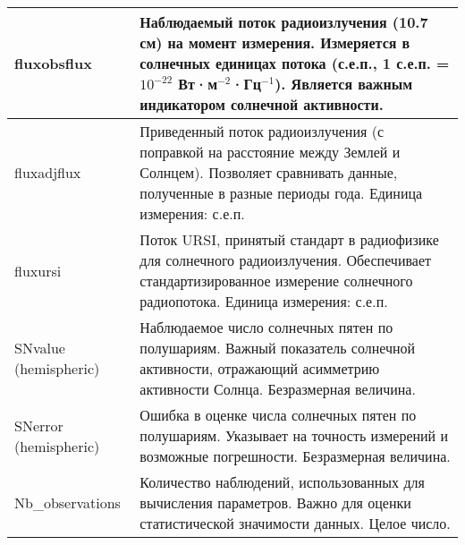 \begin{longtable}{|l|p{12cm}|}
        \hline
        fluxobsflux & Наблюдаемый поток радиоизлучения (10.7 см) на момент измерения. Измеряется в солнечных единицах потока (с.е.п., 1 с.е.п. = \(10^{-22}\) Вт·м\(^{-2}\)·Гц\(^{-1}\)). Является важным индикатором солнечной активности. \\
        \hline
        fluxadjflux & Приведенный поток радиоизлучения (с поправкой на расстояние между Землей и Солнцем). Позволяет сравнивать данные, полученные в разные периоды года. Единица измерения: с.е.п. \\
        \hline
        fluxursi & Поток URSI, принятый стандарт в радиофизике для солнечного радиоизлучения. Обеспечивает стандартизированное измерение солнечного радиопотока. Единица измерения: с.е.п. \\
        \hline
        SNvalue (hemispheric) & Наблюдаемое число солнечных пятен по полушариям. Важный показатель солнечной активности, отражающий асимметрию активности Солнца. Безразмерная величина. \\
        \hline
        SNerror (hemispheric) & Ошибка в оценке числа солнечных пятен по полушариям. Указывает на точность измерений и возможные погрешности. Безразмерная величина. \\
        \hline
        Nb\_observations & Количество наблюдений, использованных для вычисления параметров. Важно для оценки статистической значимости данных. Целое число. \\
    \end{longtable}